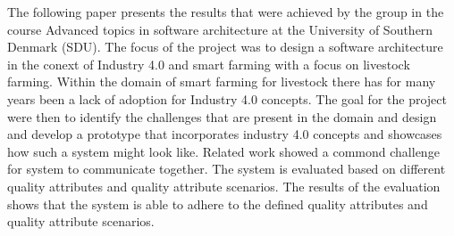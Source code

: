 The following paper presents the results that were achieved by the group in the course Advanced topics in software architecture at the University of Southern Denmark (SDU). The focus of the project was to design a software architecture in the conext of Industry 4.0 and smart farming with a focus on livestock farming. Within the domain of smart farming for livestock there has for many years been a lack of adoption for Industry 4.0 concepts. The goal for the project were then to identify the challenges that are present in the domain and design and develop a prototype that incorporates industry 4.0 concepts and showcases how such a system might look like. Related work showed a commond challenge for system to communicate together. The system is evaluated based on different quality attributes and quality attribute scenarios. The results of the evaluation shows that the system is able to adhere to the defined quality attributes and quality attribute scenarios.